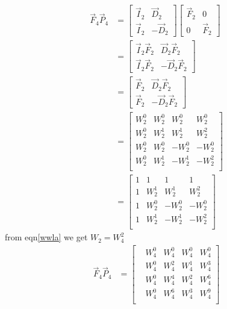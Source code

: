 \documentclass[journal,12pt,twocolumn]{IEEEtran}
\renewcommand\thesection{\arabic{section}}
\begin{document}
\begin{enumerate}[label=\arabic*.,ref=\thesection.\theenumi]
\solution \begin{align}
	\vec{F}_{4}\vec{P}_{4}&=
\begin{bmatrix}
	\vec{I}_{2} & \vec{D}_{2} \\
\vec{I}_{2} & -\vec{D}_{2}
\end{bmatrix}
\begin{bmatrix}
\vec{F}_{2} & 0 \\
0 & \vec{F}_{2}
\end{bmatrix}
\\
&=\begin{bmatrix}
	\vec{I}_{2}\vec{F}_{2} & \vec{D}_{2}\vec{F}_{2} \\
\vec{I}_{2}\vec{F}_{2} & -\vec{D}_{2}\vec{F}_{2}
\end{bmatrix}
\\
&= \begin{bmatrix}
	\vec{F}_{2} & \vec{D}_{2}\vec{F}_{2} \\
\vec{F}_{2} & -\vec{D}_{2}\vec{F}_{2}
\end{bmatrix}
\\
&=\begin{bmatrix}
	W_{2}^{0} &W_{2}^{0} &W_{2}^{0} &W_{2}^{0}\\
	W_{2}^{0} &W_{2}^{1} &W_{2}^{1} &W_{2}^{2}\\
	W_{2}^{0} &W_{2}^{0} &-W_{2}^{0} &-W_{2}^{0}\\
	W_{2}^{0} &W_{2}^{1} &-W_{2}^{1} &-W_{2}^{2}\\
\end{bmatrix}\\
&=\begin{bmatrix}
	1 &1 &1 &1\\
	1 &W_{2}^{1} &W_{2}^{1} &W_{2}^{2}\\
	1 &W_{2}^{0} &-W_{2}^{0} &-W_{2}^{0}\\
	1 &W_{2}^{1} &-W_{2}^{1} &-W_{2}^{2}\\
\end{bmatrix}
\end{align}
from eqn\eqref{wwla} we get $W_{2} = W_{4}^2$
\begin{align}
	\vec{F}_{4}\vec{P}_{4}&=\begin{bmatrix}
		&W_{4}^{0}&W_{4}^{0}&W_{4}^{0}&W_{4}^{0}\\
		&W_{4}^{0}&W_{4}^{2}&W_{4}^{1}&W_{4}^{3}\\
		&W_{4}^{0}&W_{4}^{4}&W_{4}^{2}&W_{4}^{6}\\
		&W_{4}^{0}&W_{4}^{6}&W_{4}^{3}&W_{4}^{9}\\
	\end{bmatrix}
\end{align}


\end{enumerate}
\end{document}
